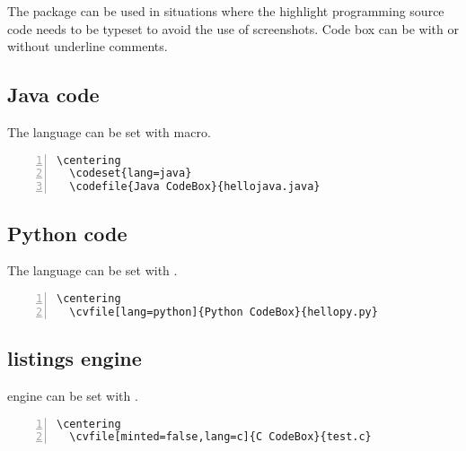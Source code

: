 \documentclass{ctxdoc-en}
\begin{document}
The  package can be used in situations
where the highlight programming source code needs to be typeset
to avoid the use of screenshots.
Code box can be with or without underline comments.

\newpage

\subsection{Java code}
The language can be set with  macro.

\begin{Verbatim}[frame=none,numbers=left,gobble=2]
  \centering
  \codeset{lang=java}
  \codefile{Java CodeBox}{hellojava.java}
\end{Verbatim}

\begin{center}
  \begin{minipage}{0.85\textwidth}
  \end{minipage}
\end{center}

\subsection{Python code}
The language can be set with .

\begin{Verbatim}[frame=none,numbers=left,gobble=2]
  \centering
  \cvfile[lang=python]{Python CodeBox}{hellopy.py}
\end{Verbatim}

\begin{center}
  \begin{minipage}{0.85\textwidth}
  \end{minipage}
\end{center}

\newpage

\subsection{listings engine}
 engine can be set with .

\begin{Verbatim}[frame=none,numbers=left,gobble=2]
  \centering
  \cvfile[minted=false,lang=c]{C CodeBox}{test.c}
\end{Verbatim}

\begin{center}
  \begin{minipage}{0.85\textwidth}
  \end{minipage}
\end{center}
\end{document}
